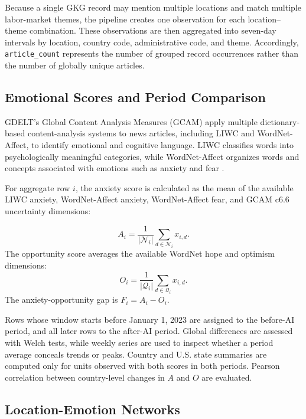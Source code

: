 \documentclass[conference]{IEEEtran}
\begin{document}
Because a single GKG record may mention multiple locations and
match multiple labor-market themes, the pipeline creates one observation
for each location--theme combination.
These observations are then aggregated into seven-day intervals by location,
country code, administrative code, and theme.
Accordingly, \texttt{article\_count} represents the number of grouped record
occurrences rather than the number of globally unique articles.

\subsection{Emotional Scores and Period Comparison}

GDELT’s Global Content Analysis Measures (GCAM) apply multiple dictionary-based 
content-analysis systems to news articles, including LIWC and WordNet-Affect, 
to identify emotional and cognitive language. 
LIWC classifies words into psychologically meaningful categories, 
while WordNet-Affect organizes words and concepts associated 
with emotions such as anxiety and fear 
\cite{tausczik2010psychological,strapparava2004wordnet,gdeltgkg2015Codebook}. 

For aggregate row $i$, the anxiety score is calculated as the mean of the available LIWC anxiety, 
WordNet-Affect anxiety, WordNet-Affect fear, and GCAM c6.6 uncertainty dimensions:

\begin{equation}
A_i=\frac{1}{|\mathcal{N}_i|}\sum_{d\in\mathcal{N}_i}x_{i,d}.
\end{equation}
The opportunity score averages the available WordNet hope and optimism
dimensions:
\begin{equation}
O_i=\frac{1}{|\mathcal{Q}_i|}\sum_{d\in\mathcal{Q}_i}x_{i,d}.
\end{equation}
The anxiety-opportunity gap is $F_i=A_i-O_i$.

Rows whose window starts before January 1, 2023 are assigned to the before-AI
period, and all later rows to the after-AI period. Global differences are
assessed with Welch tests, while weekly series are used to inspect whether a
period average conceals trends or peaks. Country and U.S. state summaries are
computed only for units observed with both scores in both periods. Pearson
correlation between country-level changes in $A$ and $O$ are evaluated.

\subsection{Location-Emotion Networks}
\end{document}
